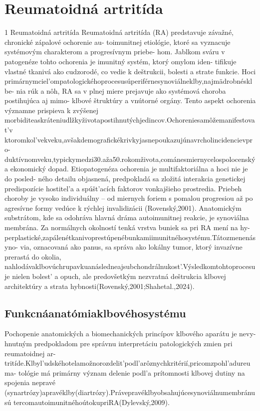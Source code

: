 \chapter{Reumatoidná artritída}

1 Reumatoidná artritída Reumatoidná artritída (RA) predstavuje závažné, chronické zápalové ochorenie au- toimunitnej etiológie, ktoré sa vyznacuje systémovým charakterom a progresívnym priebe- hom. Jablkom sváru v patogenéze tohto ochorenia je imunitný systém, ktorý omylom iden- tifikuje vlastné tkanivá ako cudzorodé, co vedie k deštrukcii, bolesti a strate funkcie. Hoci primárnymciel’ompatologickéhoprocesusúperiférnesynoviálneklby,najmädrobnésklbe- nia rúk a nôh, RA sa v plnej miere prejavuje ako systémová choroba postihujúca aj mimo- klbové štruktúry a vnútorné orgány. Tento aspekt ochorenia významne prispieva k zvýšenej morbiditeaskráteniudlžkyživotapostihnutýchjedincov.Ochoreniesamôžemanifestovat’v ktoromkol’vekveku,avšakdemografickékrivkyjasnepoukazujúnavrcholincidencievpro- duktívnomveku,typickymedzi30.aža50.rokomživota,cománesmiernycelospolocenský a ekonomický dopad. Etiopatogenéza ochorenia je multifaktoriálna a hoci nie je do posled- ného detailu objasnená, predpokladá sa zložitá interakcia genetickej predispozície hostitel’a a spúšt’acích faktorov vonkajšieho prostredia. Priebeh choroby je vysoko individuálny -- od miernych foriem s pomalou progresiou až po agresívne formy vedúce k rýchlej invalidizácii (Rovenský,2001). Anatomickým substrátom, kde sa odohráva hlavná dráma autoimunitnej reakcie, je synoviálna membrána. Za normálnych okolností tenká vrstva buniek sa pri RA mení na hy- perplastické,zapálenétkanivoprestúpenébunkamiimunitnéhosystému.Tátozmenenásyno- via, oznacovaná ako panus, sa správa ako lokálny tumor, ktorý invazívne prerastá do okolia, nahlodávaklbovúchrupavkuanásledneajsubchondrálnukost’.Výsledkomtohtoprocesuje nielen bolest’ a opuch, ale predovšetkým nezvratná deštrukcia klbovej architektúry a strata hybnosti(Rovenský,2001;Shahetal.,2024).


\section{Funkcnáanatómiaklbovéhosystému}

Pochopenie anatomických a biomechanických princípov klbového aparátu je nevy- hnutným predpokladom pre správnu interpretáciu patologických zmien pri reumatoidnej ar- tritíde.Klbyl’udskéhotelamožnorozdelit’podl’arôznychkritérií,pricomzpohl’adureuma- tológie má primárny význam delenie podl’a prítomnosti klbovej dutiny na spojenia nepravé (synartrózy)apravéklby(diartrózy).Právepravéklbyobsahujúcesynoviálnumembránusú tercomautoimunitnéhoútokupriRA(Dylevský,2009).


